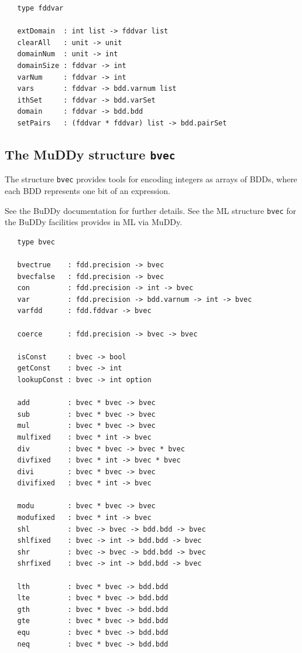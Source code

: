 \documentclass[12pt,fleqn]{article}
\renewcommand{\t}[1]{\mbox{\tt #1}}
\newcommand{\Buddy}{BuDDy{}}
\newcommand{\Muddy}{MuDDy{}}
\begin{document}
\begin{verbatim}
   type fddvar

   extDomain  : int list -> fddvar list
   clearAll   : unit -> unit
   domainNum  : unit -> int
   domainSize : fddvar -> int
   varNum     : fddvar -> int
   vars       : fddvar -> bdd.varnum list
   ithSet     : fddvar -> bdd.varSet
   domain     : fddvar -> bdd.bdd
   setPairs   : (fddvar * fddvar) list -> bdd.pairSet
\end{verbatim}

\subsection{The \Muddy{} structure \t{bvec}}\label{bvec}

The structure \t{bvec} provides tools for encoding integers as arrays
of BDDs, where each BDD represents one bit of an expression.

See the \Buddy{} documentation \cite{BuDDy} for further details. See the ML structure \t{bvec}
for the \Buddy{} facilities provides in ML via \Muddy{}.


\begin{verbatim}
   type bvec

   bvectrue    : fdd.precision -> bvec 
   bvecfalse   : fdd.precision -> bvec 
   con         : fdd.precision -> int -> bvec
   var         : fdd.precision -> bdd.varnum -> int -> bvec
   varfdd      : fdd.fddvar -> bvec

   coerce      : fdd.precision -> bvec -> bvec

   isConst     : bvec -> bool
   getConst    : bvec -> int
   lookupConst : bvec -> int option

   add         : bvec * bvec -> bvec
   sub         : bvec * bvec -> bvec
   mul         : bvec * bvec -> bvec
   mulfixed    : bvec * int -> bvec
   div         : bvec * bvec -> bvec * bvec
   divfixed    : bvec * int -> bvec * bvec
   divi        : bvec * bvec -> bvec
   divifixed   : bvec * int -> bvec

   modu        : bvec * bvec -> bvec
   modufixed   : bvec * int -> bvec
   shl         : bvec -> bvec -> bdd.bdd -> bvec
   shlfixed    : bvec -> int -> bdd.bdd -> bvec
   shr         : bvec -> bvec -> bdd.bdd -> bvec
   shrfixed    : bvec -> int -> bdd.bdd -> bvec

   lth         : bvec * bvec -> bdd.bdd
   lte         : bvec * bvec -> bdd.bdd
   gth         : bvec * bvec -> bdd.bdd
   gte         : bvec * bvec -> bdd.bdd
   equ         : bvec * bvec -> bdd.bdd
   neq         : bvec * bvec -> bdd.bdd
\end{verbatim}
\end{document}
